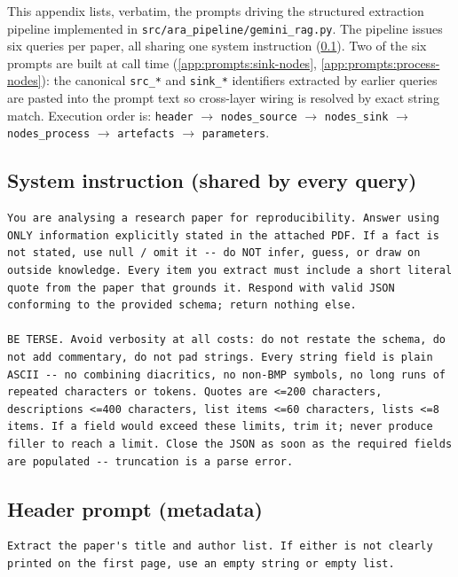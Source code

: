 \documentclass{article}
\begin{document}
This appendix lists, verbatim, the prompts driving the structured extraction pipeline implemented in \texttt{src/ara\_pipeline/gemini\_rag.py}. The pipeline issues six queries per paper, all sharing one system instruction
(\ref{app:prompts:system}). Two of the six prompts are built at call time
(\ref{app:prompts:sink-nodes}, \ref{app:prompts:process-nodes}): the
canonical \texttt{src\_*} and \texttt{sink\_*} identifiers extracted by earlier queries are pasted into the prompt text so cross-layer wiring is resolved by exact string match. Execution order is: \texttt{header}
$\rightarrow$ \texttt{nodes\_source} $\rightarrow$ \texttt{nodes\_sink}
$\rightarrow$ \texttt{nodes\_process} $\rightarrow$ \texttt{artefacts}
$\rightarrow$ \texttt{parameters}.

\subsection{System instruction (shared by every query)}
\label{app:prompts:system}

\begin{lstlisting}
You are analysing a research paper for reproducibility. Answer using ONLY information explicitly stated in the attached PDF. If a fact is not stated, use null / omit it -- do NOT infer, guess, or draw on outside knowledge. Every item you extract must include a short literal quote from the paper that grounds it. Respond with valid JSON conforming to the provided schema; return nothing else.

BE TERSE. Avoid verbosity at all costs: do not restate the schema, do not add commentary, do not pad strings. Every string field is plain ASCII -- no combining diacritics, no non-BMP symbols, no long runs of repeated characters or tokens. Quotes are <=200 characters, descriptions <=400 characters, list items <=60 characters, lists <=8 items. If a field would exceed these limits, trim it; never produce filler to reach a limit. Close the JSON as soon as the required fields are populated -- truncation is a parse error.
\end{lstlisting}

\subsection{Header prompt (metadata)}
\label{app:prompts:header}

\begin{lstlisting}
Extract the paper's title and author list. If either is not clearly printed on the first page, use an empty string or empty list.
\end{lstlisting}
\end{document}
